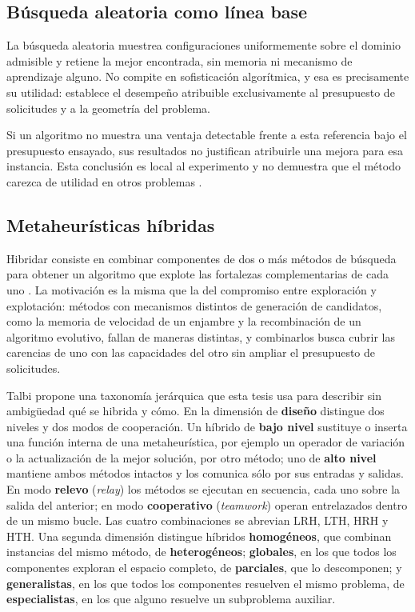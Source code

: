 \subsection{Búsqueda aleatoria como línea base}
\label{sec:linea_base}

La búsqueda aleatoria muestrea configuraciones uniformemente sobre el dominio admisible y retiene la mejor encontrada, sin memoria ni mecanismo de aprendizaje alguno. No compite en sofisticación algorítmica, y esa es precisamente su utilidad: establece el desempeño atribuible exclusivamente al presupuesto de solicitudes y a la geometría del problema.

Si un algoritmo no muestra una ventaja detectable frente a esta referencia bajo el presupuesto ensayado, sus resultados no justifican atribuirle una mejora para esa instancia. Esta conclusión es local al experimento y no demuestra que el método carezca de utilidad en otros problemas \cite{Arcuri2014Hitchhiker}.

\subsection{Metaheurísticas híbridas}

Hibridar consiste en combinar componentes de dos o más métodos de búsqueda para obtener un algoritmo que explote las fortalezas complementarias de cada uno \cite{Talbi2002Taxonomy,Blum2011HybridSurvey}. La motivación es la misma que la del compromiso entre exploración y explotación: métodos con mecanismos distintos de generación de candidatos, como la memoria de velocidad de un enjambre y la recombinación de un algoritmo evolutivo, fallan de maneras distintas, y combinarlos busca cubrir las carencias de uno con las capacidades del otro sin ampliar el presupuesto de solicitudes.

Talbi \cite{Talbi2002Taxonomy} propone una taxonomía jerárquica que esta tesis usa para describir sin ambigüedad qué se hibrida y cómo. En la dimensión de \textbf{diseño} distingue dos niveles y dos modos de cooperación. Un híbrido de \textbf{bajo nivel} sustituye o inserta una función interna de una metaheurística, por ejemplo un operador de variación o la actualización de la mejor solución, por otro método; uno de \textbf{alto nivel} mantiene ambos métodos intactos y los comunica sólo por sus entradas y salidas. En modo \textbf{relevo} (\emph{relay}) los métodos se ejecutan en secuencia, cada uno sobre la salida del anterior; en modo \textbf{cooperativo} (\emph{teamwork}) operan entrelazados dentro de un mismo bucle. Las cuatro combinaciones se abrevian LRH, LTH, HRH y HTH. Una segunda dimensión distingue híbridos \textbf{homogéneos}, que combinan instancias del mismo método, de \textbf{heterogéneos}; \textbf{globales}, en los que todos los componentes exploran el espacio completo, de \textbf{parciales}, que lo descomponen; y \textbf{generalistas}, en los que todos los componentes resuelven el mismo problema, de \textbf{especialistas}, en los que alguno resuelve un subproblema auxiliar.

